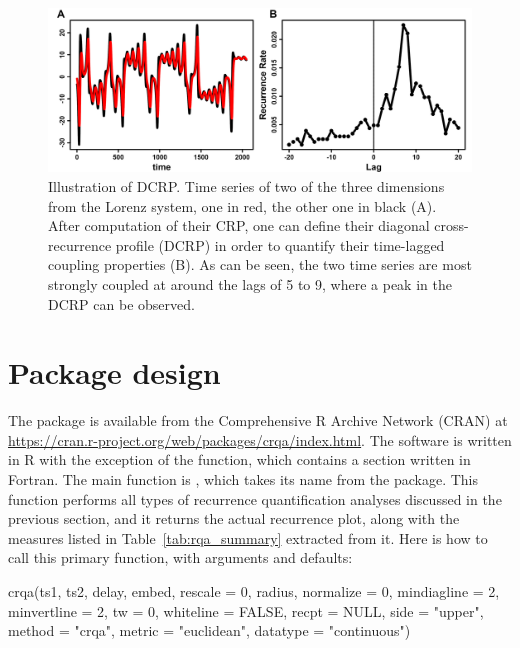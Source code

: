 \begin{figure}
\includegraphics[width=\columnwidth]{Figure3_complete.png}
\caption{\label{fig:dcrp}Illustration of DCRP. Time series of two of the three dimensions from the Lorenz system, one in red, the other one in black (A). After computation of their CRP, one can define their diagonal cross-recurrence profile (DCRP) in order to quantify their time-lagged coupling properties (B). As can be seen, the two time series are most strongly coupled at around the lags of 5 to 9, where a peak in the DCRP can be observed.}
\end{figure}

\section{Package design}

The  package is available from the Comprehensive R Archive Network (CRAN) at \url{https://cran.r-project.org/web/packages/crqa/index.html}. The software is written in R with the exception of the  function, which contains a section written in Fortran.
The main function is , which takes its name from the package. This function performs all types of recurrence quantification analyses discussed in the previous section, and it returns the actual recurrence plot, along with the measures listed in Table~\ref{tab:rqa_summary} extracted from it. Here is how to call this primary function, with arguments and defaults:

\begin{example}
crqa(ts1, ts2, delay, embed, rescale = 0, radius, normalize = 0, mindiagline = 2, 
     minvertline = 2, tw = 0, whiteline = FALSE, recpt = NULL, side = "upper", 
     method = "crqa", metric = "euclidean", datatype = "continuous")
\end{example}

